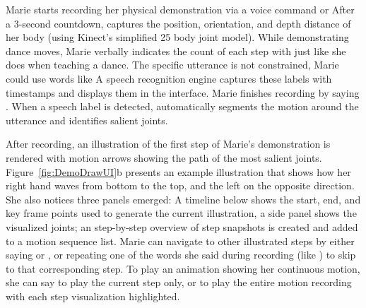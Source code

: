 Marie starts recording her physical demonstration via a voice command  or  After a 3-second countdown, \systemname{} captures the position, orientation, and depth distance of her body (using Kinect's simplified 25 body joint model).
%
While demonstrating dance moves, Marie verbally indicates the count of each step with  just like she does when teaching a dance. The specific utterance is not constrained, Marie could use words like  A speech recognition engine captures these labels with timestamps and displays them in the interface.
Marie finishes recording by saying .
%
When a speech label is detected, \systemname{} automatically segments the motion around the utterance and identifies salient joints.

After recording, an illustration of the first step of Marie's demonstration is rendered with motion arrows showing the path of the most salient joints. Figure~\ref{fig:DemoDrawUI}b presents an example illustration that shows how her right hand waves from bottom to the top, and the left on the opposite direction. She also notices three panels emerged: A timeline below shows the start, end, and key frame points used to generate the current illustration, a side panel shows the visualized joints; an step-by-step overview of step snapshots is created and added to a motion sequence list.
%
Marie can navigate to other illustrated steps by either saying  or , or repeating one of the words she said during recording (like ) to skip to that corresponding step. To play an animation showing her continuous motion, she can say  to play the current step only, or  to play the entire motion recording with each step visualization highlighted.

